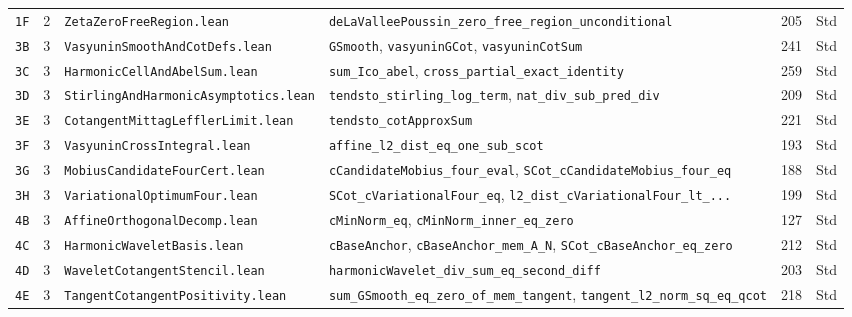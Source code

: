 \documentclass[11pt,a4paper]{article}
\theoremstyle{definition}
\begin{document}
\begin{longtable}{@{}ll>{\raggedright\arraybackslash}p{5.2cm}>{\raggedright\arraybackslash}p{6.8cm}cc@{}}
\texttt{1F} & 2 & \texttt{ZetaZeroFreeRegion.lean} & \texttt{deLaValleePoussin\_\allowbreak zero\_\allowbreak free\_\allowbreak region\_\allowbreak unconditional} & 205 & Std \\
\texttt{3B} & 3 & \texttt{VasyuninSmoothAndCotDefs.lean} & \texttt{GSmooth}, \texttt{vasyuninGCot}, \texttt{vasyuninCotSum} & 241 & Std \\
\texttt{3C} & 3 & \texttt{HarmonicCellAndAbelSum.lean} & \texttt{sum\_\allowbreak Ico\_\allowbreak abel}, \texttt{cross\_\allowbreak partial\_\allowbreak exact\_\allowbreak identity} & 259 & Std \\
\texttt{3D} & 3 & \texttt{Stirling\allowbreak And\allowbreak Harmonic\allowbreak Asymptotics.lean} & \texttt{tendsto\_\allowbreak stirling\_\allowbreak log\_\allowbreak term}, \texttt{nat\_\allowbreak div\_\allowbreak sub\_\allowbreak pred\_\allowbreak div} & 209 & Std \\
\texttt{3E} & 3 & \texttt{CotangentMittagLefflerLimit.lean} & \texttt{tendsto\_\allowbreak cotApproxSum} & 221 & Std \\
\texttt{3F} & 3 & \texttt{VasyuninCrossIntegral.lean} & \texttt{affine\_\allowbreak l2\_\allowbreak dist\_\allowbreak eq\_\allowbreak one\_\allowbreak sub\_\allowbreak scot} & 193 & Std \\
\texttt{3G} & 3 & \texttt{MobiusCandidateFourCert.lean} & \texttt{cCandidateMobius\_\allowbreak four\_\allowbreak eval}, \texttt{SCot\_\allowbreak cCandidateMobius\_\allowbreak four\_\allowbreak eq} & 188 & Std \\
\texttt{3H} & 3 & \texttt{VariationalOptimumFour.lean} & \texttt{SCot\_\allowbreak cVariationalFour\_\allowbreak eq}, \texttt{l2\_\allowbreak dist\_\allowbreak cVariationalFour\_\allowbreak lt\_\allowbreak ...} & 199 & Std \\
\texttt{4B} & 3 & \texttt{AffineOrthogonalDecomp.lean} & \texttt{cMinNorm\_\allowbreak eq}, \texttt{cMinNorm\_\allowbreak inner\_\allowbreak eq\_\allowbreak zero} & 127 & Std \\
\texttt{4C} & 3 & \texttt{HarmonicWaveletBasis.lean} & \texttt{cBaseAnchor}, \texttt{cBaseAnchor\_\allowbreak mem\_\allowbreak A\_\allowbreak N}, \texttt{SCot\_\allowbreak cBaseAnchor\_\allowbreak eq\_\allowbreak zero} & 212 & Std \\
\texttt{4D} & 3 & \texttt{WaveletCotangentStencil.lean} & \texttt{harmonicWavelet\_\allowbreak div\_\allowbreak sum\_\allowbreak eq\_\allowbreak second\_\allowbreak diff} & 203 & Std \\
\texttt{4E} & 3 & \texttt{TangentCotangentPositivity.lean} & \texttt{sum\_\allowbreak GSmooth\_\allowbreak eq\_\allowbreak zero\_\allowbreak of\_\allowbreak mem\_\allowbreak tangent}, \texttt{tangent\_\allowbreak l2\_\allowbreak norm\_\allowbreak sq\_\allowbreak eq\_\allowbreak qcot} & 218 & Std \\

\end{longtable}
\end{document}
